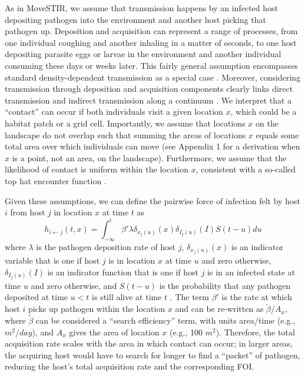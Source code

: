 \documentclass[letterpaper]{article}
\begin{document}
As in MoveSTIR, we assume that transmission happens by an infected host depositing pathogen into the environment and another host picking that pathogen up. 
Deposition and acquisition can represent a range of processes, from one individual coughing and another inhaling in a matter of seconds, to one host depositing parasite eggs or larvae in the environment and another individual consuming these  days or weeks later. 
This fairly general assumption encompasses standard density-dependent transmission as a special case \citep{Cortez2021}. 
Moreover, considering transmission through deposition and acquisition components clearly links direct transmission and indirect transmission along a continuum \citep{Wilber2022}.
We interpret that a ``contact'' can occur if both individuals visit a given location $x$, which could be a habitat patch or a grid cell. 
Importantly, we assume that locations $x$ on the landscape do not overlap such that summing the areas of locations $x$ equals some total area over which individuals can move (see Appendix 1 for a derivation when $x$ is a point, not an area, on the landscape). 
Furthermore, we assume that the likelihood of contact is uniform within the location $x$, consistent with a so-called top hat encounter function \citep{Gurarie2013,Wilber2022}.

Given these assumptions, we can define the pairwise force of infection felt by host $i$ from host $j$ in location $x$ at time $t$ as \citep{Wilber2022}
\begin{equation}
    h_{i \leftarrow j}(t, x) = \int_{-\infty}^{t} \beta' \lambda \delta_{x_j(u)}(x) \delta_{I_j(u)}(I) S(t - u) du
    \label{eq:original_foi}
\end{equation}
where $\lambda$ is the pathogen deposition rate of host $j$, $\delta_{x_j(u)}(x)$ is an indicator variable that is one if host $j$ is in location $x$ at time $u$ and zero otherwise, $\delta_{I_j(u)}(I)$ is an indicator function that is one if host $j$ is in an infected state at time $u$ and zero otherwise, and $S(t-u)$ is the probability that any pathogen deposited at time $u < t$ is still alive at time $t$ \citep[see][for a full derivation]{Wilber2022}.  
The term $\beta'$ is the rate at which host $i$ picks up pathogen within the location $x$ and can be re-written as $\tilde{\beta} / A_x$, where $\tilde{\beta}$ can be considered a ``search efficiency'' term, with units area/time (e.g., $m^2 / day$), and $A_x$ gives the area of location $x$ (e.g., 100 $m^2$). 
Therefore, the total acquisition rate scales with the area in which contact can occur; in larger areas, the acquiring host would have to search for longer to find a ``packet'' of pathogen, reducing the host's total acquisition rate and the corresponding FOI. 
\end{document}
